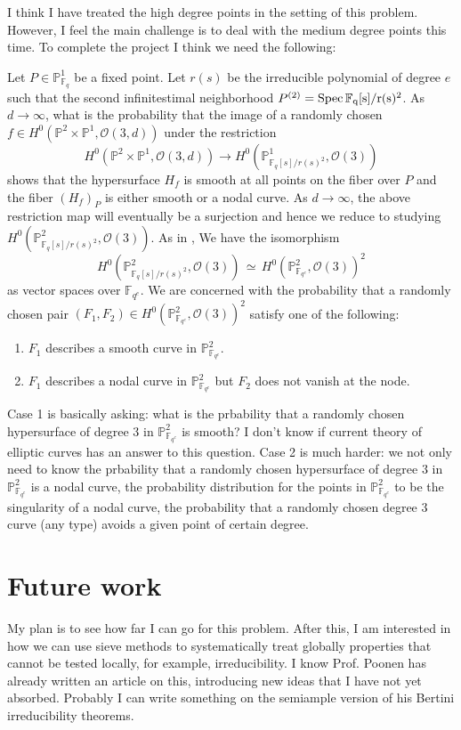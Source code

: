 \documentclass[12pt]{article}
\theoremstyle{plain}
\theoremstyle{definition}
\newcommand{\IF}{\mathbb{F}}
\newcommand{\IP}{\mathbb{P}}
\newcommand{\sO}{\mathcal{O}}
\newcommand{\Spec}{\rm Spec\,}
\newcommand\iso{{\, \simeq \,}}
\newcommand{\<}{\langle}
\renewcommand{\>}{\rangle}
\begin{document}
I think I have treated the high degree points in the setting of this problem. However, I feel the main challenge is to deal with the medium degree points this time. 
To complete the project I think we need the following:

Let $P \in \IP^1_{\IF_q}$ be a fixed point. Let $r(s)$ be the irreducible polynomial of degree $e$ such that the second infinitestimal neighborhood $P^{(2)} = \Spec \IF_q[s]/r(s)^2$. As $d \to \infty$, what is the probability that the image of a randomly chosen $f \in H^0(\IP^2 \times \IP^1, \sO(3, d))$ under the restriction 
$$ H^0(\IP^2 \times \IP^1, \sO(3, d)) \to H^0(\IP^1_{\IF_q[s]/r(s)^2}, \sO(3))$$
shows that the hypersurface $H_f$ is smooth at all points on the fiber over $P$ and the fiber $(H_f)_P$ is either smooth or a nodal curve. As $d \to \infty$, the above restriction map will eventually be a surjection and hence we reduce to studying $H^0(\IP^2_{\IF_q[s]/r(s)^2}, \sO(3))$. As in \cite{Wood}, We have the isomorphism 
$$ H^0(\IP^2_{\IF_q[s]/r(s)^2}, \sO(3)) \iso H^0(\IP^2_{\IF_{q^e}}, \sO(3))^2 $$
as vector spaces over $\IF_{q^e}$. We are concerned with the probability that a randomly chosen pair $(F_1, F_2) \in H^0(\IP^2_{\IF_{q^e}}, \sO(3))^2$ satisfy one of the following:
\begin{enumerate}
\item $F_1$ describes a smooth curve in $\IP^2_{\IF_{q^e}}$. 
\item $F_1$ describes a nodal curve in $\IP^2_{\IF_{q^e}}$ but $F_2$ does not vanish at the node. 
\end{enumerate}
Case 1 is basically asking: what is the prbability that a randomly chosen hypersurface of degree $3$ in $\IP^2_{\IF_{q^e}}$ is smooth? I don't know if current theory of elliptic curves has an answer to this question. Case 2 is much harder: we not only need to know the prbability that a randomly chosen hypersurface of degree $3$ in $\IP^2_{\IF_{q^e}}$ is a nodal curve, the probability distribution for the points in $\IP_{\IF_{q^e}}^2$ to be the singularity of a nodal curve, the probability that a randomly chosen degree 3 curve (any type) avoids a given point of certain degree. 

\section{Future work}
My plan is to see how far I can go for this problem. After this, I am interested in how we can use sieve methods to systematically treat globally properties that cannot be tested locally, for example, irreducibility. I know Prof. Poonen has already written an article on this, introducing new ideas that I have not yet absorbed. Probably I can write something on the semiample version of his Bertini irreducibility theorems.
\end{document}
